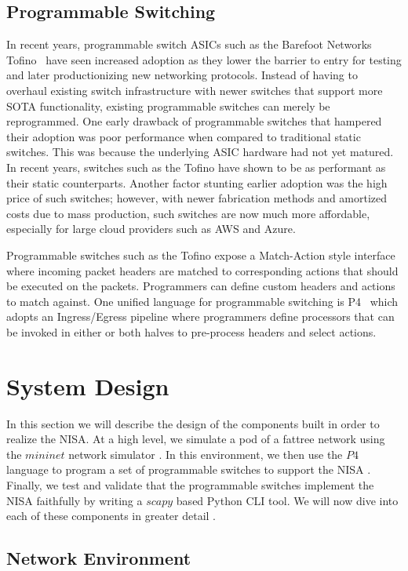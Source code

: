 \subsection{Programmable Switching}
In recent years, programmable switch ASICs such as the Barefoot Networks Tofino~\cite{tofino} have seen increased adoption as they lower the barrier to entry for testing and later productionizing new networking protocols. Instead of having to overhaul existing switch infrastructure with newer switches that support more SOTA functionality, existing programmable switches can merely be reprogrammed. One early drawback of programmable switches that hampered their adoption was poor performance when compared to traditional static switches. This was because the underlying ASIC hardware had not yet matured. In recent years, switches such as the Tofino have shown to be as performant as their static counterparts. Another factor stunting earlier adoption was the high price of such switches; however, with newer fabrication methods and amortized costs due to mass production, such switches are now much more affordable, especially for large cloud providers such as AWS and Azure.

Programmable switches such as the Tofino expose a Match-Action style interface where incoming packet headers are matched to corresponding actions that should be executed on the packets. Programmers can define custom headers and actions to match against. One unified language for programmable switching is P4~\cite{p4} which adopts an Ingress/Egress pipeline where programmers define processors that can be invoked in either or both halves to pre-process headers and select actions.

\section{System Design}

In this section we will describe the design of the components built in order to realize the NISA. At a high level, we simulate a pod of a fattree network using the $mininet$ network simulator \cite{mininet}. In this environment, we then use the $P4$ language to program a set of programmable switches to support the NISA \cite{p4}. Finally, we test and validate that the programmable switches implement the NISA faithfully by writing a $scapy$ based Python CLI tool. We will now dive into each of these components in greater detail \cite{scapy}.

\subsection{Network Environment}

